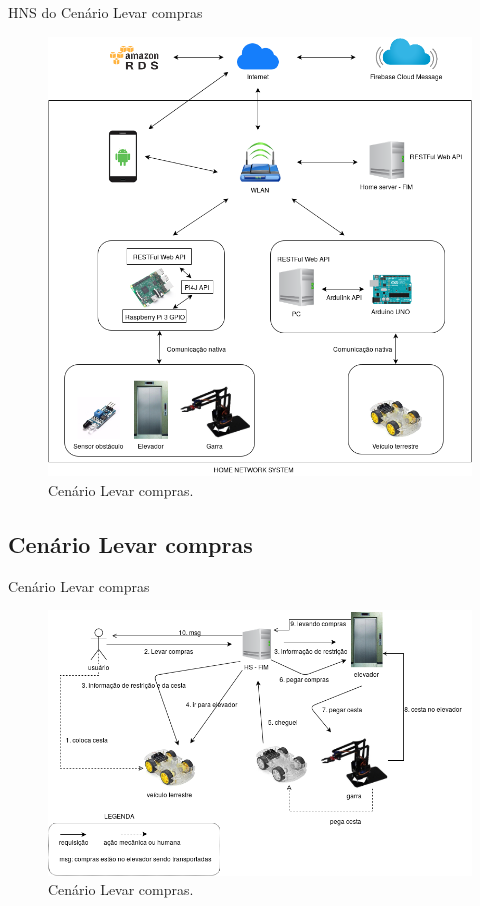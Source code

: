 \documentclass[brazil]{beamer}
\begin{document}
\begin{frame}{HNS do Cenário Levar compras}
\begin{figure}[!htb] \centering 
  \centering
  \includegraphics[width=0.7\columnwidth]{slide/cenario} 
  \caption{Cenário Levar compras.} 
  \label{fig:hns}
\end{figure}
\end{frame}

\subsection{Cenário Levar compras}
\begin{frame}{Cenário Levar compras}
\begin{figure}[!htb] \centering 
  \centering
  \includegraphics[width=0.9\columnwidth]{slide/cenario_requests} 
  \caption{Cenário Levar compras.} 
  \label{fig:cenariolevarcompras}
\end{figure}
\end{frame}
\end{document}
